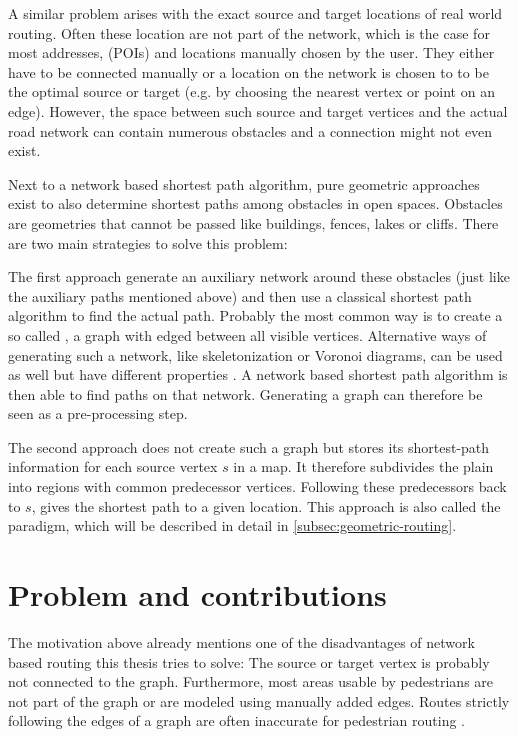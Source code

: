 	A similar problem arises with the exact source and target locations of real world routing.
	Often these location are not part of the network, which is the case for most addresses,  (POIs) and locations manually chosen by the user.
	They either have to be connected manually or a location on the network is chosen to to be the optimal source or target (e.g. by choosing the nearest vertex or point on an edge).
	However, the space between such source and target vertices and the actual road network can contain numerous obstacles and a connection might not even exist.
	
	Next to a network based shortest path algorithm, pure geometric approaches exist to also determine shortest paths among obstacles in open spaces.
	Obstacles are geometries that cannot be passed like buildings, fences, lakes or cliffs.
	There are two main strategies to solve this problem\cite[2]{hershberger-suri}:
	
	The first approach generate an auxiliary network around these obstacles (just like the auxiliary paths mentioned above) and then use a classical shortest path algorithm to find the actual path.
	Probably the most common way is to create a so called , a graph with edged between all visible vertices.
	Alternative ways of generating such a network, like skeletonization or Voronoi diagrams, can be used as well but have different properties \cite[3-4]{graser-osm-open-spaces}.
	A network based shortest path algorithm is then able to find paths on that network\cite[2]{hershberger-suri}.
	Generating a graph can therefore be seen as a pre-processing step.
	
	The second approach does not create such a graph but stores its shortest-path information for each source vertex $s$ in a map.
	It therefore subdivides the plain into regions with common predecessor vertices.
	Following these predecessors back to $s$, gives the shortest path to a given location.
	This approach is also called the  paradigm, which will be described in detail in \cref{subsec:geometric-routing}.
	
\section{Problem and contributions}

	The motivation above already mentions one of the disadvantages of network based routing this thesis tries to solve:
	The source or target vertex is probably not connected to the graph.
	Furthermore, most areas usable by pedestrians are not part of the graph or are modeled using manually added edges.
	Routes strictly following the edges of a graph are often inaccurate for pedestrian routing \cite[1]{graser-osm-open-spaces}.


